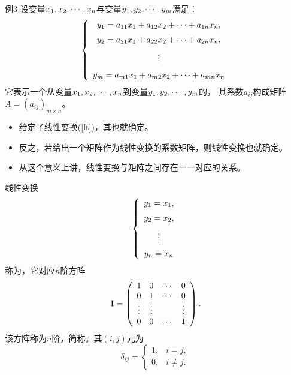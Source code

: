 \begin{frame}
  \begin{footnotesize}

    \begin{exampleblock}{例3}
      设变量$x_1, x_2, \cdots, x_n$与变量$y_1,y_2,\cdots,y_m$满足：
      \begin{equation}\label{lt}
      \left\{
      \begin{array}{c}
        y_1  = a_{11} x_1 + a_{12} x_2 + \cdots + a_{1n} x_n, \\[0.2cm]
        y_2  = a_{21} x_1 + a_{22} x_2 + \cdots + a_{2n} x_n, \\[0.2cm]
             \vdots \\[0.2cm]
        y_m  = a_{m1} x_1 + a_{m2} x_2 + \cdots + a_{mn} x_n
      \end{array}
      \right.
      \end{equation}
      它表示一个从变量$x_1, x_2, \cdots, x_n$到变量$y_1,y_2,\cdots,y_m$的，
      其系数$a_{ij}$构成矩阵$A=(a_{ij})_{m\times n}$。
    \end{exampleblock}
    \pause 
    \begin{itemize}
    \item  给定了线性变换(\ref{lt})，其也就确定。 \pause
    \item   反之，若给出一个矩阵作为线性变换的系数矩阵，则线性变换也就确定。\pause 
    \item   从这个意义上讲，线性变换与矩阵之间存在一一对应的关系。
    \end{itemize}
  \end{footnotesize}
\end{frame}

\begin{frame}
  \begin{footnotesize}
    线性变换
    $$
    \left\{
    \begin{array}{c}
      y_1 = x_1, \\[0.2cm]
      y_2 = x_2, \\[0.2cm]
      \vdots \\[0.2cm]
      y_n = x_n
    \end{array}
    \right.
    $$
    称为，\pause 它对应$n$阶方阵
    $$
    \mathbf{I} = \left(
    \begin{array}{cccc}
      1    & 0    & \cdots  & 0 \\
      0    & 1    & \cdots  & 0 \\
      \vdots  & \vdots  &      & \vdots \\
      0    & 0    & \cdots  & 1
    \end{array}
    \right). 
    $$\pause 
    该方阵称为$n$阶，简称。其$(i,j)$元为
    $$
    \delta_{ij} = \left \{
    \begin{array}{ll}
      1, &i=j, \\
      0, &i\ne j.
    \end{array}
    \right.  
    $$
  \end{footnotesize}
\end{frame}



